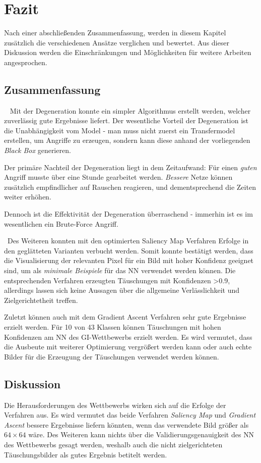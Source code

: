 \chapter{Fazit}
\label{cha:Fazit} \label{cha:Schluss}
Nach einer abschließenden Zusammenfassung, werden in diesem Kapitel zusätzlich die verschiedenen Ansätze verglichen und bewertet. Aus dieser Diskussion werden die Einschränkungen und Möglichkeiten für weitere Arbeiten angesprochen.

\section{Zusammenfassung} ~\newline 
Mit der Degeneration konnte ein simpler Algorithmus erstellt werden, welcher zuverlässig gute Ergebnisse liefert. 
Der wesentliche Vorteil der Degeneration ist die Unabhängigkeit vom Model - man muss nicht zuerst ein Transfermodel erstellen, um Angriffe zu erzeugen, sondern kann diese anhand der vorliegenden \textit{Black Box} generieren.  

Der primäre Nachteil der Degeneration liegt in dem Zeitaufwand: Für einen \textit{guten} Angriff musste über eine Stunde gearbeitet werden. \textit{Bessere} Netze können zusätzlich empfindlicher auf Rauschen reagieren, und dementsprechend die Zeiten weiter erhöhen. 
  
Dennoch ist die Effektivität der Degeneration überraschend - immerhin ist es im wesentlichen ein Brute-Force Angriff. 

~\newline Des Weiteren konnten mit den optimierten Saliency Map Verfahren Erfolge in den geglätteten Varianten verbucht werden. Somit konnte bestätigt werden, dass die Visualisierung der relevanten Pixel für ein Bild mit hoher Konfidenz geeignet sind, um als \textit{minimale Beispiele} für das NN verwendet werden können. 
Die entsprechenden Verfahren erzeugten Täuschungen mit Konfidenzen >0.9, allerdings lassen sich keine Aussagen über die allgemeine Verlässlichkeit und Zielgerichtetheit treffen.

Zuletzt können auch mit dem Gradient Ascent Verfahren sehr gute Ergebnisse erzielt werden. Für 10 von 43 Klassen können Täuschungen mit hohen Konfidenzen am \ac{NN} des \ac{GI}-Wettbewerbs erzielt werden. Es wird vermutet, dass die Ausbeute mit weiterer Optimierung vergrößert werden kann oder auch echte Bilder für die Erzeugung der Täuschungen verwendet werden können. 


\section{Diskussion}
Die Herausforderungen des Wettbewerbs wirken sich auf die Erfolge der Verfahren aus. Es wird vermutet das beide Verfahren \textit{Saliency Map} und \textit{Gradient Ascent} bessere Ergebnisse liefern könnten, wenn das verwendete Bild größer als $64\times64$ wäre. Des Weiteren kann nichts über die Validierungsgenauigkeit des \ac{NN} des Wettbewerbs gesagt werden, weshalb auch die nicht zielgerichteten Täuschungsbilder als gutes Ergebnis betitelt werden. 


